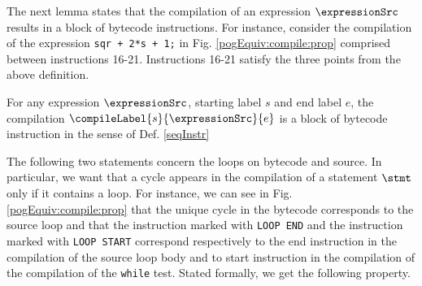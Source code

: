 The next lemma states that the compilation of an expression $\expressionSrc$ results in
 a block of bytecode instructions.  For instance, consider the compilation of the expression \lstinline!sqr + 2*s + 1;! in Fig. \ref{pogEquiv:compile:prop}  
 comprised between instructions 16-21. Instructions  16-21 satisfy the three points from the above definition.
\begin{compProp}\label{compile:prop:compProp3}
    For any expression $\expressionSrc$, starting label $s$ and end label $e$,
    the compilation $\compileLabel{s}{\expressionSrc}{e}$ is a block of bytecode instruction in the sense of Def. \ref{seqInstr}
   
\end{compProp}


The following two statements concern the loops on bytecode and source. 
In particular, we want that a cycle appears in the compilation of a statement  $\stmt$  only if it contains a loop.
For instance, we can  see in Fig. \ref{pogEquiv:compile:prop} that the unique cycle in the bytecode corresponds to the source loop and that the 
instruction marked with \lstinline!LOOP END! and the instruction marked with \lstinline!LOOP START! correspond respectively to the end instruction   in the 
compilation of the source loop body   and to start instruction in the compilation of the compilation of the \lstinline!while! test. 
Stated formally, we get the following property. 

